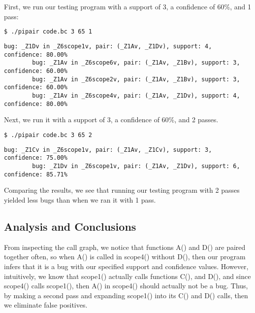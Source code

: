 \documentclass{article}
\begin{document}
\begin{enumerate}[(a)]
      First, we run our testing program with a support of 3, a confidence of 60\%, and 1 pass:
      \begin{lstlisting}[language=bash]
        $ ./pipair code.bc 3 65 1
      \end{lstlisting}

      \begin{lstlisting}[basicstyle=\small\ttfamily]
        bug: _Z1Dv in _Z6scope1v, pair: (_Z1Av, _Z1Dv), support: 4, confidence: 80.00%
        bug: _Z1Av in _Z6scope6v, pair: (_Z1Av, _Z1Bv), support: 3, confidence: 60.00%
        bug: _Z1Av in _Z6scope2v, pair: (_Z1Av, _Z1Bv), support: 3, confidence: 60.00%
        bug: _Z1Av in _Z6scope4v, pair: (_Z1Av, _Z1Dv), support: 4, confidence: 80.00%
      \end{lstlisting}

      Next, we run it with a support of 3, a confidence of 60\%, and 2 passes.
      \begin{lstlisting}[language=bash]
        $ ./pipair code.bc 3 65 2
      \end{lstlisting}

      \begin{lstlisting}[basicstyle=\small\ttfamily]
        bug: _Z1Cv in _Z6scope1v, pair: (_Z1Av, _Z1Cv), support: 3, confidence: 75.00%
        bug: _Z1Dv in _Z6scope1v, pair: (_Z1Av, _Z1Dv), support: 6, confidence: 85.71%
      \end{lstlisting}

      Comparing the results, we see that running our testing program with 2 passes yielded less bugs than when we ran it with 1 pass.

      \subsection*{Analysis and Conclusions}
      From inspecting the call graph, we notice that functions A() and D() are paired together often, so when A() is called in scope4() without D(), then our program infers that it is a bug with our specified support and confidence values. However, intuitively, we know that scope1() actually calls functions C(), and D(), and since scope4() calls scope1(), then A() in scope4() should actually not be a bug. Thus, by making a second pass and expanding scope1() into its C() and D() calls, then we eliminate false positives.

  \end{enumerate}
\end{document}
